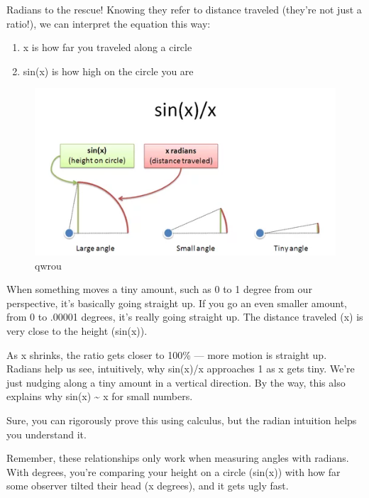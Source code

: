 \documentclass[
  12pt,
]{article}
\providecommand{\tightlist}{%
  \setlength{\itemsep}{0pt}\setlength{\parskip}{0pt}}
\begin{document}
Radians to the rescue! Knowing they refer to distance traveled (they're
not just a ratio!), we can interpret the equation this way:

\begin{enumerate}
\def\labelenumi{\arabic{enumi}.}
\tightlist
\item
  x is how far you traveled along a circle
\item
  sin(x) is how high on the circle you are
\end{enumerate}

\begin{figure}
\centering
\includegraphics{sinx.png}
\caption{qwrou}
\end{figure}

When something moves a tiny amount, such as 0 to 1 degree from our
perspective, it's basically going straight up. If you go an even smaller
amount, from 0 to .00001 degrees, it's really going straight up. The
distance traveled (x) is very close to the height (sin(x)).

As x shrinks, the ratio gets closer to 100\% --- more motion is straight
up. Radians help us see, intuitively, why sin(x)/x approaches 1 as x
gets tiny. We're just nudging along a tiny amount in a vertical
direction. By the way, this also explains why sin(x) \textasciitilde{} x
for small numbers.

Sure, you can rigorously prove this using calculus, but the radian
intuition helps you understand it.

Remember, these relationships only work when measuring angles with
radians. With degrees, you're comparing your height on a circle (sin(x))
with how far some observer tilted their head (x degrees), and it gets
ugly fast.
\end{document}
